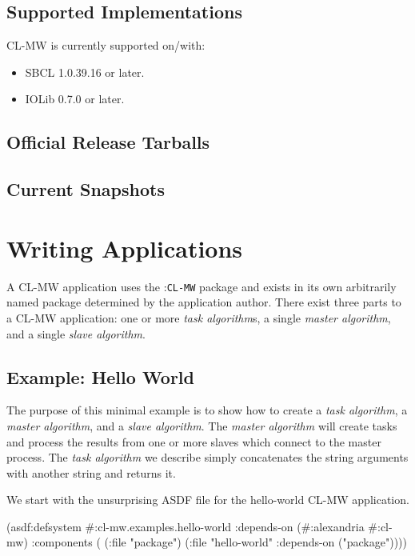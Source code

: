 \documentclass[titlepage,12pt]{book}
\newcommand{\xsmall}{\latexhtml{\small}{}}
\newcommand{\xnormalsize}{\latexhtml{\normalsize}{}}
\newcommand{\clmw}{\xsmall\textsc{CL-MW}\xnormalsize\xspace}
\newcommand{\package}[1]{\mbox{:\uppercase{\xsmall\texttt{#1}\xnormalsize}} package\xspace}
\newcommand{\mwpackage}{\package{CL-MW}}
\newcommand{\sa}{\textit{slave algorithm}\xspace}
\newcommand{\ma}{\textit{master algorithm}\xspace}
\newcommand{\ta}{\textit{task algorithm}\xspace}
\newcommand{\tas}{\textit{task algorithm}s\xspace}
\newcommand{\file}[1]{\texttt{#1}\xspace}
\newcommand{\Todo}{\begin{center}\fbox{\textbf{TODO}}\end{center}}
\begin{document}
\section{Supported Implementations}

\clmw is currently supported on/with: 

\begin{itemize}
\item SBCL 1.0.39.16 or later.
\item IOLib 0.7.0 or later.
\end{itemize}

\section{Official Release Tarballs}

\Todo

\section{Current Snapshots}

\Todo

\chapter{Writing Applications}

A \clmw application uses the \mwpackage and exists in its own
arbitrarily named package determined by the application author.
There exist three parts to a \clmw application: one or more \tas,
a single \ma, and a single \sa.

\section{Example: Hello World}

The purpose of this minimal example is to show how to create a \ta,
a \ma, and a \sa. The \ma will create tasks and process the results
from one or more slaves which connect to the master process. The \ta
we describe simply concatenates the string arguments with another
string and returns it.

We start with the unsurprising ASDF file for the hello-world \clmw application.

\begin{lisp}[caption=\file{cl-mw.examples.hello-world.asd}]
(asdf:defsystem #:cl-mw.examples.hello-world
  :depends-on (#:alexandria #:cl-mw)
  :components ( (:file "package")
                (:file "hello-world"
                       :depends-on ("package"))))
\end{lisp}
\end{document}
